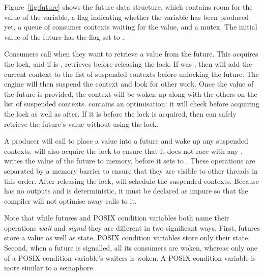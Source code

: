 Figure~\ref{fig:future} shows the future data structure,
which contains room for the value of the variable,
a flag indicating whether the variable has been produced yet,
a queue of consumer contexts waiting for the value, and a mutex.
The initial value of the future has the flag set to
.

Consumers call \wait when they want to retrieve a value from the future.
This acquires the lock, and if  is 
, retrieves
 before releasing the lock.
If  was ,
then \wait will add the current context to
the list of suspended contexts before unlocking the future.
The engine will then suspend the context and look for other work.
Once the value of the future is provided,
the context will be woken up along with the others on the list of suspended
contexts.
\wait contains an optimisation:
it will check  before
acquiring the lock as well as after.
If it is  before the lock is acquired,
then \wait can safely retrieve the
future's value without using the lock.

A producer will call \signal to place a value into a future and wake up any
suspended contexts.
\signal will also acquire the lock to ensure that it does not race with any \wait.
\signal writes the value of the future to memory,
before it sets 
 to .
These operations are separated by a memory barrier to ensure that they are
visible to other threads in this order.
After releasing the lock, \signal will schedule the suspended contexts.
Because \signal has no outputs and is deterministic,
it must be declared as impure so that the compiler will not optimise away calls
to it.

Note that while futures and POSIX condition variables
\citep{butenhof1997:pthreads}
both name their operations \emph{wait} and \emph{signal} they are
different in two significant ways.
First,
futures store a value as well as state,
POSIX condition variables store only their state.
Second,
when a future is signalled, all its consumers are woken,
whereas only one of a POSIX condition variable's waiters is woken.
A POSIX condition variable is more similar to a semaphore.

